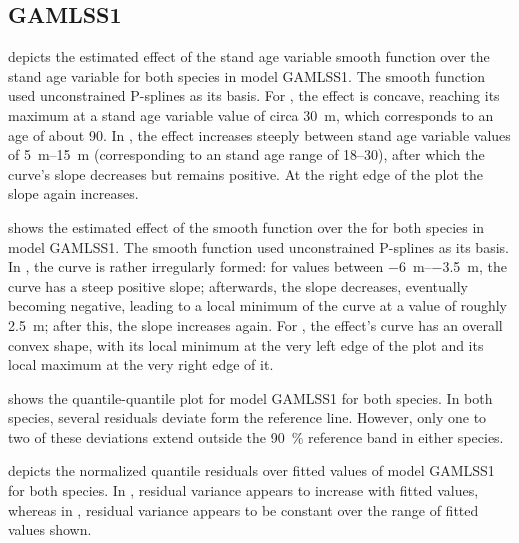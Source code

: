 \subsection{GAMLSS1}

 depicts the estimated effect of the stand age variable smooth function over the stand age variable for both species in model GAMLSS1.  The smooth function used unconstrained P-splines as its basis.  For \Beech{}, the effect is concave, reaching its maximum at a stand age variable value of circa \SI{30}{\meter}, which corresponds to an age of about \SI{90}{\year}.  In \Spruce{}, the effect increases steeply between stand age variable values of \SIrange{5}{15}{\meter} (corresponding to an stand age range of \SIrange{18}{30}{\year}), after which the curve’s slope decreases but remains positive.  At the right edge of the plot the slope again increases.

 shows the estimated effect of the \ProductivityIndexVariableText{} smooth function over the \ProductivityIndexVariableText{} for both species in model GAMLSS1.  The smooth function used unconstrained P-splines as its basis.  In \Beech{}, the curve is rather irregularly formed:  for \ProductivityIndexVariableText{} values between \SIrange{-6}{-3.5}{\meter}, the curve has a steep positive slope;  afterwards, the slope decreases, eventually becoming negative, leading to a local minimum of the curve at a \ProductivityIndexVariableText{} value of roughly \SI{2.5}{\meter}; after this, the slope increases again.  For \Spruce{}, the effect’s curve has an overall convex shape, with its local minimum at the very left edge of the plot and its local maximum at the very right edge of it.

 shows the quantile-quantile plot for model GAMLSS1 for both species.  In both species, several residuals deviate form the reference line.  However, only one to two of these deviations extend outside the \SI{90}{\percent} reference band in either species.

 depicts the normalized quantile residuals over fitted values of model GAMLSS1 for both species.  In \Beech{}, residual variance appears to increase with fitted values, whereas in \Spruce{}, residual variance appears to be constant over the range of fitted values shown.


